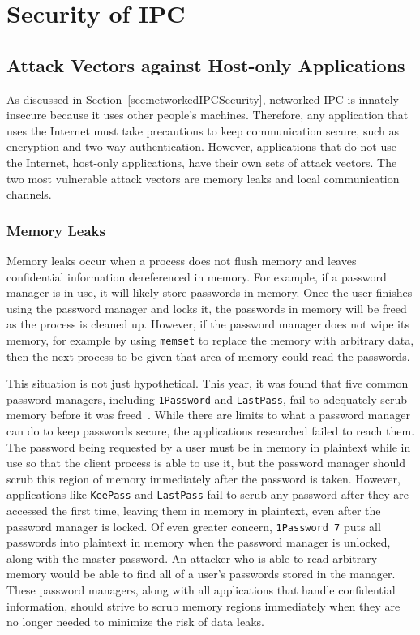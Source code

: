 \chapter{Security of IPC}
\label{sec:securityOfIPC}

\section{Attack Vectors against Host-only Applications}
\label{sec:hostOnlyAttackVectors}
As discussed in Section~\ref{sec:networkedIPCSecurity}, networked IPC is innately insecure because it uses other people's machines.  Therefore, any application that uses the Internet must take precautions to keep communication secure, such as encryption and two-way authentication.  However, applications that do not use the Internet, host-only applications, have their own sets of attack vectors.  The two most vulnerable attack vectors are memory leaks and local communication channels.

\subsection{Memory Leaks}
\label{sec:memoryLeaks}
Memory leaks occur when a process does not flush memory and leaves confidential information dereferenced in memory.  For example, if a password manager is in use, it will likely store passwords in memory.  Once the user finishes using the password manager and locks it, the passwords in memory will be freed as the process is cleaned up.  However, if the password manager does not wipe its memory, for example by using \texttt{memset} to replace the memory with arbitrary data, then the next process to be given that area of memory could read the passwords.

This situation is not just hypothetical.  This year, it was found that five common password managers, including \texttt{1Password} and \texttt{LastPass}, fail to adequately scrub memory before it was freed~\cite{independent_security_evaluators_2019}.  While there are limits to what a password manager can do to keep passwords secure, the applications researched failed to reach them.  The password being requested by a user must be in memory in plaintext while in use so that the client process is able to use it, but the password manager should scrub this region of memory immediately after the password is taken.  However, applications like \texttt{KeePass} and \texttt{LastPass} fail to scrub any password after they are accessed the first time, leaving them in memory in plaintext, even after the password manager is locked.  Of even greater concern, \texttt{1Password 7} puts all passwords into plaintext in memory when the password manager is unlocked, along with the master password.  An attacker who is able to read arbitrary memory would be able to find all of a user's passwords stored in the manager.  These password managers, along with all applications that handle confidential information, should strive to scrub memory regions immediately when they are no longer needed to minimize the risk of data leaks.

